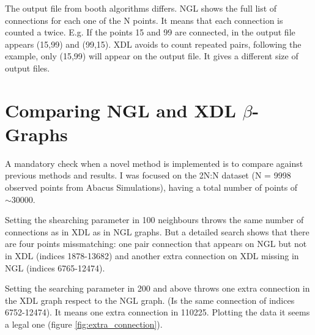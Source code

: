 \documentclass[preprint]{aastex62}
\begin{document}
The output file from booth algorithms differs. NGL shows the full list of connections
for each one of the N points. It means that each connection is counted a twice.
E.g. If the points 15 and 99 are connected, in the output file appears (15,99) and
(99,15). XDL avoids to count repeated pairs, following the example, only (15,99) will
appear on the output file. It gives a different size of output files.

\section{Comparing NGL and XDL $\beta$-Graphs}

A mandatory check when a novel method is implemented is to compare against
previous methods and results.  I was focused on the 2N:N dataset (N = 9998
observed points from Abacus Simulations), having a total number of points
of $\sim 30000$.

Setting the shearching parameter in 100 neighbours throws the same number
of connections as in XDL as in NGL graphs. But a detailed search shows that 
there are four points missmatching: one pair connection that appears on NGL
but not in XDL (indices 1878-13682) and another extra connection on XDL
missing in NGL (indices 6765-12474).

Setting the searching parameter in 200 and above throws one extra connection
in the XDL graph respect to the NGL graph. (Is the same connection of indices
6752-12474). It means one extra connection in 110225. Plotting the data it
seems a legal one (figure \ref{fig:extra_connection}).
\end{document}
